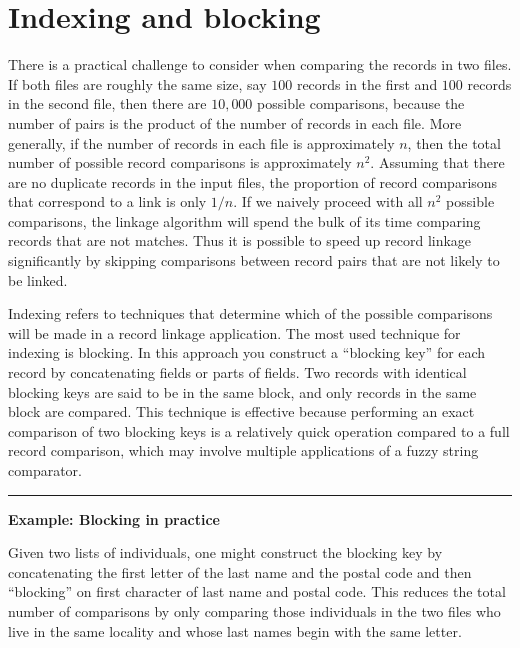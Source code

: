 \documentclass[]{krantz}
\begin{document}
\hypertarget{S:indexing}{\section{Indexing and
blocking}\label{S:indexing}}

There is a practical challenge to consider when comparing the records in
two files. If both files are roughly the same size, say \(100\) records
in the first and \(100\) records in the second file, then there are
\(10{,}000\) possible comparisons, because the number of pairs is the
product of the number of records in each file. More generally, if the
number of records in each file is approximately \(n\), then the total
number of possible record comparisons is approximately \(n^2\). Assuming
that there are no duplicate records in the input files, the proportion
of record comparisons that correspond to a link is only \(1/n\). If we
naively proceed with all \(n^2\) possible comparisons, the linkage
algorithm will spend the bulk of its time comparing records that are not
matches. Thus it is possible to speed up record linkage significantly by
skipping comparisons between record pairs that are not likely to be
linked.

Indexing refers to techniques that determine which of the possible
comparisons will be made in a record linkage application. The most used
technique for indexing is blocking. In this approach you construct a
``blocking key'' for each record by concatenating fields or parts of
fields. Two records with identical blocking keys are said to be in the
same block, and only records in the same block are compared. This
technique is effective because performing an exact comparison of two
blocking keys is a relatively quick operation compared to a full record
comparison, which may involve multiple applications of a fuzzy string
comparator.

\begin{center}\rule{0.5\linewidth}{\linethickness}\end{center}

\textbf{Example: Blocking in practice}

Given two lists of individuals, one might construct the blocking key by
concatenating the first letter of the last name and the postal code and
then ``blocking'' on first character of last name and postal code. This
reduces the total number of comparisons by only comparing those
individuals in the two files who live in the same locality and whose
last names begin with the same letter.
\end{document}
